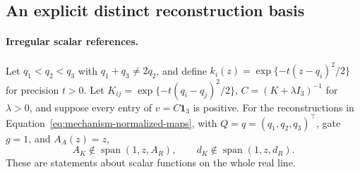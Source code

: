 \subsection{An explicit distinct reconstruction basis}

\paragraph{Irregular scalar references.}
Let $q_1<q_2<q_3$ with $q_1+q_3\ne2q_2$, and define
$k_i(z)=\exp\{-t(z-q_i)^2/2\}$ for precision $t>0$.
Let $K_{ij}=\exp\{-t(q_i-q_j)^2/2\}$,
$C=(K+\lambda I_3)^{-1}$ for $\lambda>0$, and suppose every entry of
$v=C\mathbf1_3$ is positive. For the reconstructions in
Equation~\eqref{eq:mechanism-normalized-maps}, with $Q=q=(q_1,q_2,q_3)^\top$,
gate $g=1$, and $A_A(z)=z$,
\[
 A_K\notin\operatorname{span}(1,z,A_R),\qquad
 d_K\notin\operatorname{span}(1,z,d_R).
\]
These are statements about scalar functions on the whole real line.
